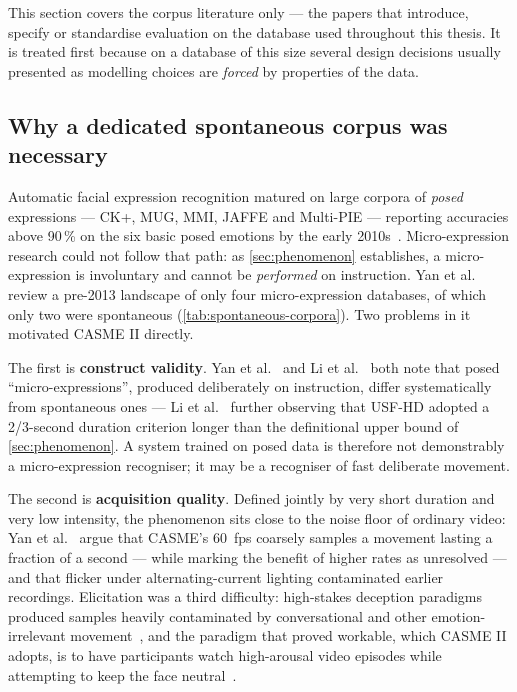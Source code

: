 This section covers the corpus literature only --- the papers that introduce, specify or standardise evaluation on the database used throughout this thesis. It is treated first because on a database of this size several design decisions usually presented as modelling choices are \textit{forced} by properties of the data.

\subsection{Why a dedicated spontaneous corpus was necessary}
\label{sec:why-spontaneous}

Automatic facial expression recognition matured on large corpora of \textit{posed} expressions --- CK+, MUG, MMI, JAFFE and Multi-PIE --- reporting accuracies above 90\,\% on the six basic posed emotions by the early 2010s~\cite{yan2014}. Micro-expression research could not follow that path: as \autoref{sec:phenomenon} establishes, a micro-expression is involuntary and cannot be \textit{performed} on instruction. Yan et al.~\cite{yan2014} review a pre-2013 landscape of only four micro-expression databases, of which only two were spontaneous (\autoref{tab:spontaneous-corpora}). Two problems in it motivated CASME II directly.

The first is \textbf{construct validity}. Yan et al.~\cite{yan2014} and Li et al.~\cite{liX2013} both note that posed ``micro-expressions'', produced deliberately on instruction, differ systematically from spontaneous ones --- Li et al.~\cite{liX2013} further observing that USF-HD adopted a 2/3-second duration criterion longer than the definitional upper bound of \autoref{sec:phenomenon}. A system trained on posed data is therefore not demonstrably a micro-expression recogniser; it may be a recogniser of fast deliberate movement.

The second is \textbf{acquisition quality}. Defined jointly by very short duration and very low intensity, the phenomenon sits close to the noise floor of ordinary video: Yan et al.~\cite{yan2014} argue that CASME's 60~fps coarsely samples a movement lasting a fraction of a second --- while marking the benefit of higher rates as unresolved --- and that flicker under alternating-current lighting contaminated earlier recordings. Elicitation was a third difficulty: high-stakes deception paradigms produced samples heavily contaminated by conversational and other emotion-irrelevant movement~\cite{yan2014}, and the paradigm that proved workable, which CASME II adopts, is to have participants watch high-arousal video episodes while attempting to keep the face neutral~\cite{liX2013}.

